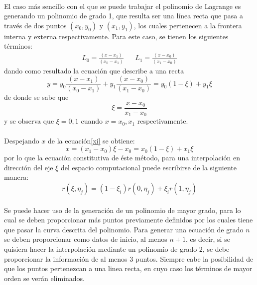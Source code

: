 \documentclass[letterpaper, openright, 12pt]{book}
\begin{document}
    \paragraph*{}
    El caso más sencillo con el que se puede trabajar el polinomio de
    Lagrange es generando un polinomio de grado 1, que resulta ser una línea
    recta que pasa a través de dos puntos $(x_{0} , y_{0})$ y $(x_{1}, y_{1})$,
    los cuales pertenecen a la frontera interna y externa respectivamente.
    Para este caso, se tienen los siguientes términos:
    \begin{align*}
        L_{0} = \frac{( x - x_{1} )}{(x_{0} - x_{1})} &&
        L_{1} = \frac{( x - x_{0} )}{(x_{1} - x_{0} )}
    \end{align*}
    dando como resultado la ecuación que describe a una recta
    \begin{equation}
        y = y_{0} \frac{( x - x_{1} )}{( x_{0} - x_{1} )}
            + y_{1} \frac{(x - x_{0})}{( x_{1} - x_{0} )}
          = y_{0} (1 - \xi) + y_{1}\xi
    \end{equation}
    de donde se sabe que
    \begin{equation}
        \xi = \frac{x - x_{0}}{x_{1} - x_{0}}
        \label{xi}
    \end{equation}
    y se observa que $\xi = 0, 1$ cuando $x = x_{0}, x_{1}$ respectivamente.

    \paragraph*{}
    Despejando $x$ de la ecuación\ref{xi} se obtiene:
    \begin{equation}
        x = (x_{1} - x_{0})\xi - x_{0} = x_{0}(1 - \xi) + x_{1}\xi
    \end{equation}
    por lo que la ecuación constitutiva de éste método, para una
    interpolación en dirección del eje $\xi$ del espacio computacional puede
    escribirse de la siguiente manera:
    \begin{equation}
        r(\xi, \eta_{j}) = (1 - \xi_{i}) r(0, \eta_{j}) + \xi_{i}r(1, \eta_{j})
    \end{equation}

    \paragraph*{}
    Se puede hacer uso de la generación de un polinomio de mayor grado, para
    lo cual se deben proporcionar más puntos previamente definidos por los
    cuales tiene que pasar la curva descrita del polinomio. Para generar una
    ecuación de grado $n$ se deben proporcionar como datos de inicio, al
    menos $n+1$, es decir, si se quisiera hacer la interpolación mediante un
    polinomio de grado 2, se debe proporcionar la información de al menos 3
    puntos. Siempre cabe la posibilidad de que los puntos pertenezcan a una
    linea recta, en cuyo caso los términos de mayor orden se verán
    eliminados.
\end{document}
